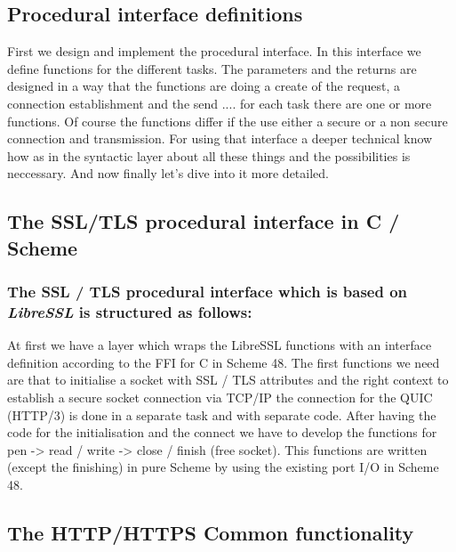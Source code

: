 \documentclass[10pt,a4paper,english]{article}
\newcommand{\code}[1]{{\tt{#1}}}
\newcommand{\abbrhighcol}[1]{\textbf{\textit{#1}}}
\begin{document}
\begin{multicols}{2}
\section{Procedural interface definitions}
\begin{flushleft}
First we design and implement the procedural interface. In this interface we define functions for the different tasks. The parameters and the returns are designed in a way that  the functions are doing a create of the request, a connection establishment and the send .... for each task there  are  one or more functions. Of course the functions differ if the use either a secure or a non secure connection and transmission. For using that interface a deeper technical know how as in the syntactic layer about all these things and the possibilities is   neccessary.
And now finally let's dive into it more detailed.
\end{flushleft}
\subsection{The SSL/TLS procedural interface in C / Scheme}
\subsubsection{The SSL / TLS procedural interface which is based on \abbrhighcol{LibreSSL} is structured as follows:}
\begin{flushleft}
At first we have a layer which wraps the LibreSSL functions with an interface definition according to the FFI for C in Scheme 48.  \newline The first functions we need are that to initialise a socket with SSL / TLS attributes and the right context to establish a secure socket connection via TCP/IP the connection for the QUIC (HTTP/3) is done in a separate task and with separate code.  \newline After having the code for the initialisation and the connect we have to develop the functions for \newline \code open -> read / write -> close / finish (free socket). \newline This functions are written (except the finishing) in pure Scheme by using the existing port I/O in Scheme 48.

\end{flushleft}
\subsection{The HTTP/HTTPS Common functionality}
\begin{flushleft}
\end{flushleft}

\end{multicols}
\end{document}
